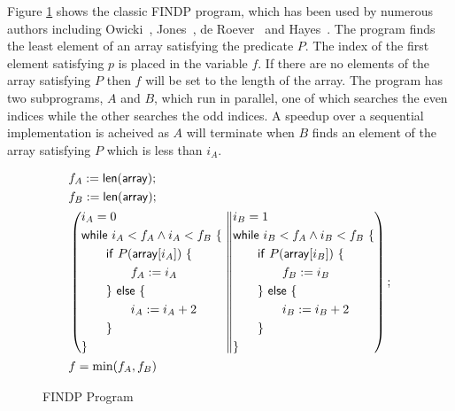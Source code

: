 \documentclass{llncs}
\begin{document}
Figure \ref{fig:findp} shows the classic FINDP program, which has been
used by numerous authors including Owicki~\cite{owicki_axiomatic_1975},
Jones~\cite{jones_development_1981}, de Roever~\cite{de_roever_concurrency_2001} and
Hayes~\cite{hayes_refining_2013}. The program finds the least element of an array
satisfying the predicate $P$. The index of the first element
satisfying $p$ is placed in the variable $f$. If there are no elements
of the array satisfying $P$ then $f$ will be set to the length of the
array. The program has two subprograms, $A$ and $B$, which run in
parallel, one of which searches the even indices while the other
searches the odd indices. A speedup over a sequential implementation
is acheived as $A$ will terminate when $B$ finds an element of the
array satisfying $P$ which is less than $i_A$.
\begin{figure}
\[
\begin{aligned}
&f_A := \mathsf{len}(\mathsf{array});\\
&f_B := \mathsf{len}(\mathsf{array});\\
&\left(
\begin{aligned}
&i_A = 0\\
&\text{\textsf{while} } i_A < f_A \land i_A < f_B \text{ \{ }\\
&\qquad\text{\textsf{if} } P(\mathsf{array}[i_A]) \text{ \{}\\
&\qquad\qquad f_A := i_A\\
&\qquad\text{\} \textsf{else} \{}\\
&\qquad\qquad i_A := i_A + 2\\
&\qquad\text{\}}\\
&\text{\}}
\end{aligned}
\middle\|
\begin{aligned}
&i_B = 1\\
&\text{\textsf{while} } i_B < f_A \land i_B < f_B \text{ \{}\\
&\qquad\text{\textsf{if} } P(\mathsf{array}[i_B]) \text{ \{}\\
&\qquad\qquad f_B := i_B\\
&\qquad\text{\} \textsf{else} \{}\\
&\qquad\qquad i_B := i_B + 2\\
&\qquad\text{\}}\\
&\text{\}}
\end{aligned}
\right);\\
&f = \text{min}(f_A,f_B)
\end{aligned}
\]
\caption{FINDP Program}
\label{fig:findp}
\end{figure}
\end{document}

